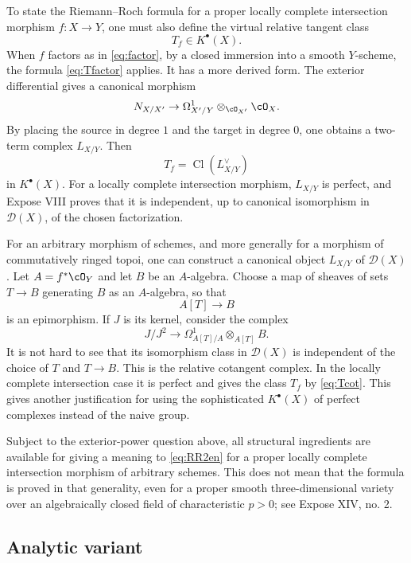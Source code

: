 \documentclass[11pt]{article}
\theoremstyle{plain}
\theoremstyle{definition}
\theoremstyle{remark}
\newcommand{\D}{\mathcal D}\newcommand{\E}{\mathcal E}\newcommand{\F}{\mathcal F}
\providecommand{\Cl}{\operatorname{Cl}}
\begin{document}
To state the Riemann--Roch formula for a proper locally complete intersection morphism $f:X\to Y$, one must also define the virtual relative tangent class
\[
   T_f\in K^{\bullet}(X).
\]
When $f$ factors as in \eqref{eq:factor}, by a closed immersion into a smooth $Y$-scheme, the formula \eqref{eq:Tfactor} applies. It has a more derived form. The exterior differential gives a canonical morphism
\begin{equation}\label{eq:conormalmap}
   N_{X/X'}\to \Omega^1_{X'/Y}\otimes_{\cO_{X'}}\cO_X.
\end{equation}
By placing the source in degree $1$ and the target in degree $0$, one obtains a two-term complex $L_{X/Y}$. Then
\begin{equation}\label{eq:Tcot}
   T_f=\Cl(L_{X/Y}^{\vee})
\end{equation}
in $K^{\bullet}(X)$. For a locally complete intersection morphism, $L_{X/Y}$ is perfect, and Expose VIII proves that it is independent, up to canonical isomorphism in $\D(X)$, of the chosen factorization.

For an arbitrary morphism of schemes, and more generally for a morphism of commutatively ringed topoi, one can construct a canonical object $L_{X/Y}$ of $\D(X)$. Let $A=f^*\cO_Y$ and let $B$ be an $A$-algebra. Choose a map of sheaves of sets $T\to B$ generating $B$ as an $A$-algebra, so that
\[
   A[T]\to B
\]
is an epimorphism. If $J$ is its kernel, consider the complex
\begin{equation}\label{eq:cotcomplex}
   J/J^2\to \Omega^1_{A[T]/A}\otimes_{A[T]}B.
\end{equation}
It is not hard to see that its isomorphism class in $\D(X)$ is independent of the choice of $T$ and $T\to B$. This is the relative cotangent complex. In the locally complete intersection case it is perfect and gives the class $T_f$ by \eqref{eq:Tcot}. This gives another justification for using the sophisticated $K^{\bullet}(X)$ of perfect complexes instead of the naive group.

Subject to the exterior-power question above, all structural ingredients are available for giving a meaning to \eqref{eq:RR2en} for a proper locally complete intersection morphism of arbitrary schemes. This does not mean that the formula is proved in that generality, even for a proper smooth three-dimensional variety over an algebraically closed field of characteristic $p>0$; see Expose XIV, no. 2.

\subsection{Analytic variant}
\end{document}

